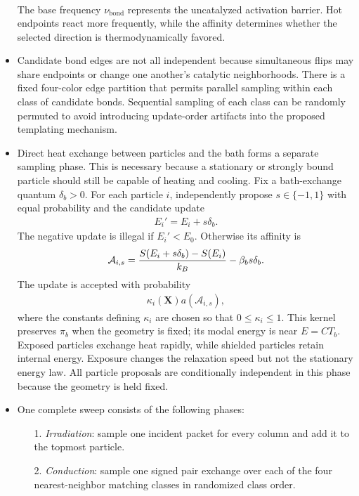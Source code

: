\documentclass[12pt,letterpaper]{article}
\newcommand{\mb}{\mathbf}
\newcommand{\mc}{\mathcal}
\begin{document}
\begin{itemize}
\begin{align*}
\end{align*}
The base frequency $\nu_{\mathrm{bond}}$ represents the uncatalyzed activation barrier. Hot endpoints react more frequently, while the affinity determines whether the selected direction is thermodynamically favored.
\item Candidate bond edges are not all independent because simultaneous flips may share endpoints or change one another's catalytic neighborhoods. There is a fixed four-color edge partition that permits parallel sampling within each class of candidate bonds. Sequential sampling of each class can be randomly permuted to avoid introducing update-order artifacts into the proposed templating mechanism.
\item Direct heat exchange between particles and the bath forms a separate sampling phase. This is necessary because a stationary or strongly bound particle should still be capable of heating and cooling. Fix a bath-exchange quantum $\delta_{b}>0$. For each particle $i$, independently propose $s\in\{-1,1\}$ with equal probability and the candidate update
\begin{align*}
E_{i}'=E_{i}+s\delta_{b}.
\end{align*}
The negative update is illegal if $E_{i}'<E_{0}$. Otherwise its affinity is
\begin{align*}
\mc{A}_{i,s}={S(E_{i}+s\delta_{b})-S(E_{i})\over k_{B}}-\beta_{b}s\delta_{b}.
\end{align*}
The update is accepted with probability
\begin{align*}
\kappa_{i}(\mb{X})a(\mc{A}_{i,s}),
\end{align*}
where the constants defining $\kappa_{i}$ are chosen so that $0\leq\kappa_{i}\leq1$. This kernel preserves $\pi_{b}$ when the geometry is fixed; its modal energy is near $E=CT_{b}$. Exposed particles exchange heat rapidly, while shielded particles retain internal energy. Exposure changes the relaxation speed but not the stationary energy law. All particle proposals are conditionally independent in this phase because the geometry is held fixed.
\item One complete sweep consists of the following phases:
\begin{itemize}
\item[1.] \emph{Irradiation}: sample one incident packet for every column and add it to the topmost particle.
\item[2.] \emph{Conduction}: sample one signed pair exchange over each of the four nearest-neighbor matching classes in randomized class order.

\end{itemize}
\end{itemize}
\end{document}
